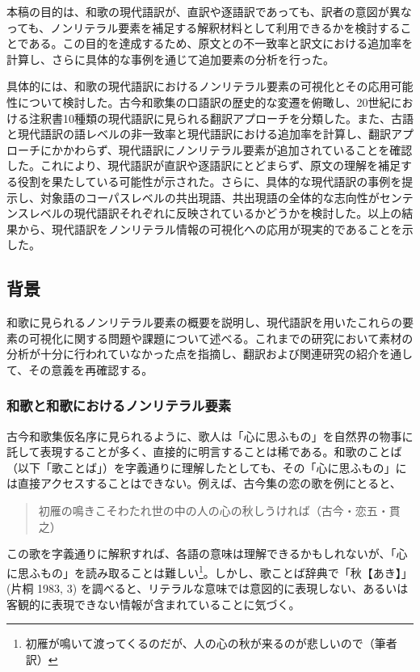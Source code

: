 \documentclass[
  letterpaper,
  DIV=11,
  numbers=noendperiod]{scrartcl}
\begin{document}
本稿の目的は、和歌の現代語訳が、直訳や逐語訳であっても、訳者の意図が異なっても、ノンリテラル要素を補足する解釈材料として利用できるかを検討することである。この目的を達成するため、原文との不一致率と訳文における追加率を計算し、さらに具体的な事例を通じて追加要素の分析を行った。

具体的には、和歌の現代語訳におけるノンリテラル要素の可視化とその応用可能性について検討した。古今和歌集の口語訳の歴史的な変遷を俯瞰し、20世紀における注釈書10種類の現代語訳に見られる翻訳アプローチを分類した。また、古語と現代語訳の語レベルの非一致率と現代語訳における追加率を計算し、翻訳アプローチにかかわらず、現代語訳にノンリテラル要素が追加されていることを確認した。これにより、現代語訳が直訳や逐語訳にとどまらず、原文の理解を補足する役割を果たしている可能性が示された。さらに、具体的な現代語訳の事例を提示し、対象語のコーパスレベルの共出現語、共出現語の全体的な志向性がセンテンスレベルの現代語訳それぞれに反映されているかどうかを検討した。以上の結果から、現代語訳をノンリテラル情報の可視化への応用が現実的であることを示した。

\subsection{背景}\label{ux80ccux666f}

和歌に見られるノンリテラル要素の概要を説明し、現代語訳を用いたこれらの要素の可視化に関する問題や課題について述べる。これまでの研究において素材の分析が十分に行われていなかった点を指摘し、翻訳および関連研究の紹介を通して、その意義を再確認する。

\subsubsection{和歌と和歌におけるノンリテラル要素}\label{ux548cux6b4cux3068ux548cux6b4cux306bux304aux3051ux308bux30ceux30f3ux30eaux30c6ux30e9ux30ebux8981ux7d20}

古今和歌集仮名序に見られるように、歌人は「心に思ふもの」を自然界の物事に託して表現することが多く、直接的に明言することは稀である。和歌のことば（以下「歌ことば」）を字義通りに理解したとしても、その「心に思ふもの」には直接アクセスすることはできない。例えば、古今集の恋の歌を例にとると、

\begin{quote}
初雁の鳴きこそわたれ世の中の人の心の秋しうければ（古今・恋五・貫之）
\end{quote}

この歌を字義通りに解釈すれば、各語の意味は理解できるかもしれないが、「心に思ふもの」を読み取ることは難しい\footnote{初雁が鳴いて渡ってくるのだが、人の心の秋が来るのが悲しいので（筆者訳）}。しかし、歌ことば辞典で「秋【あき】」(片桐
1983, 3)
を調べると、リテラルな意味では意図的に表現しない、あるいは客観的に表現できない情報が含まれていることに気づく。
\end{document}
